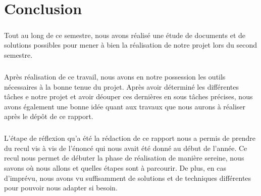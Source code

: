 \chapter*{Conclusion}

\paragraph{}
Tout au long de ce semestre, nous avons réalisé une étude de documents et de solutions possibles pour mener à bien la réalisation de notre projet lors du second semestre.

\paragraph{}
Après réalisation de ce travail, nous avons en notre possession les outils nécessaires à la bonne tenue du projet. Après avoir déterminé les différentes tâches e notre projet et avoir déouper ces dernières en sous tâches précises, nous avons également une bonne idée quant aux travaux que nous aurons à réaliser après le dépôt de ce rapport. 

\paragraph{}
L'étape de réflexion qu'a été la rédaction de ce rapport nous a permis de prendre du recul vis à vis de l'énoncé qui nous avait été donné au début de l'année. Ce recul nous permet de débuter la phase de réalisation de manière sereine, nous savons où nous allons et quelles étapes sont à parcourir. De plus, en cas d'imprévu, nous avons vu suffisamment de solutions et de techniques différentes pour pouvoir nous adapter si besoin.

\paragraph{}

